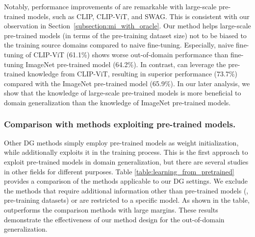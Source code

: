 Notably, performance improvements of \method{} are remarkable with large-scale pre-trained models, such as CLIP, CLIP-ViT, and SWAG. This is consistent with our observation in Section~\ref{subsection:mi_with_oracle}.
Our method helps large-scale pre-trained models (in terms of the pre-training dataset size) not to be biased to the training source domains compared to naive fine-tuning. Especially, naive fine-tuning of CLIP-ViT (61.1\%) shows worse out-of-domain performance than fine-tuning ImageNet pre-trained model (64.2\%). 
In contrast, \method{} can leverage the pre-trained knowledge from CLIP-ViT, resulting in superior performance (73.7\%) compared with the ImageNet pre-trained model (65.9\%).
In our later analysis, we show that the knowledge of large-scale pre-trained models is more beneficial to domain generalization than the knowledge of ImageNet pre-trained models.



\subsubsection{Comparison with methods exploiting pre-trained models.}
\label{subsubsection:learning_from_pretrained_exp}
Other DG methods simply employ pre-trained models as weight initialization, while \method{} additionally exploits it in the training process. This is the first approach to exploit pre-trained models in domain generalization, but there are several studies in other fields for different purposes. Table \ref{table:learning_from_pretrained} provides a comparison of the methods applicable to our DG settings. We exclude the methods that require additional information other than pre-trained models (\eg, pre-training datasets) or are restricted to a specific model.
As shown in the table, \method{} outperforms the comparison methods with large margins. These results demonstrate the effectiveness of our method design for the out-of-domain generalization.

